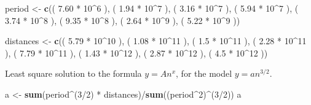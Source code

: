 \documentclass[]{article}
\newenvironment{Shaded}{\begin{snugshade}}{\end{snugshade}}
\newcommand{\KeywordTok}[1]{\textcolor[rgb]{0.13,0.29,0.53}{\textbf{{#1}}}}
\newcommand{\DecValTok}[1]{\textcolor[rgb]{0.00,0.00,0.81}{{#1}}}
\newcommand{\FloatTok}[1]{\textcolor[rgb]{0.00,0.00,0.81}{{#1}}}
\newcommand{\StringTok}[1]{\textcolor[rgb]{0.31,0.60,0.02}{{#1}}}
\newcommand{\NormalTok}[1]{{#1}}
\begin{document}
\begin{Shaded}
\begin{Highlighting}[]
\NormalTok{period <-}\StringTok{ }\KeywordTok{c}\NormalTok{(( }\FloatTok{7.60} \NormalTok{*}\StringTok{ }\DecValTok{10}\NormalTok{^}\DecValTok{6} \NormalTok{), ( }\FloatTok{1.94} \NormalTok{*}\StringTok{ }\DecValTok{10}\NormalTok{^}\DecValTok{7} \NormalTok{), ( }\FloatTok{3.16} \NormalTok{*}\StringTok{ }\DecValTok{10}\NormalTok{^}\DecValTok{7} \NormalTok{), }
            \NormalTok{( }\FloatTok{5.94} \NormalTok{*}\StringTok{ }\DecValTok{10}\NormalTok{^}\DecValTok{7} \NormalTok{), ( }\FloatTok{3.74} \NormalTok{*}\StringTok{ }\DecValTok{10}\NormalTok{^}\DecValTok{8} \NormalTok{), ( }\FloatTok{9.35} \NormalTok{*}\StringTok{ }\DecValTok{10}\NormalTok{^}\DecValTok{8} \NormalTok{), }
            \NormalTok{( }\FloatTok{2.64} \NormalTok{*}\StringTok{ }\DecValTok{10}\NormalTok{^}\DecValTok{9} \NormalTok{), ( }\FloatTok{5.22} \NormalTok{*}\StringTok{ }\DecValTok{10}\NormalTok{^}\DecValTok{9} \NormalTok{))}

\NormalTok{distances <-}\StringTok{ }\KeywordTok{c}\NormalTok{(( }\FloatTok{5.79} \NormalTok{*}\StringTok{ }\DecValTok{10}\NormalTok{^}\DecValTok{10} \NormalTok{), ( }\FloatTok{1.08} \NormalTok{*}\StringTok{ }\DecValTok{10}\NormalTok{^}\DecValTok{11} \NormalTok{), ( }\FloatTok{1.5} \NormalTok{*}\StringTok{ }\DecValTok{10}\NormalTok{^}\DecValTok{11}  \NormalTok{), }
               \NormalTok{( }\FloatTok{2.28} \NormalTok{*}\StringTok{ }\DecValTok{10}\NormalTok{^}\DecValTok{11} \NormalTok{), ( }\FloatTok{7.79} \NormalTok{*}\StringTok{ }\DecValTok{10}\NormalTok{^}\DecValTok{11} \NormalTok{), ( }\FloatTok{1.43} \NormalTok{*}\StringTok{ }\DecValTok{10}\NormalTok{^}\DecValTok{12} \NormalTok{), }
               \NormalTok{( }\FloatTok{2.87} \NormalTok{*}\StringTok{ }\DecValTok{10}\NormalTok{^}\DecValTok{12} \NormalTok{), ( }\FloatTok{4.5} \NormalTok{*}\StringTok{ }\DecValTok{10}\NormalTok{^}\DecValTok{12}  \NormalTok{))}
\end{Highlighting}
\end{Shaded}

Least square solution to the formula \(y = An^x\), for the model
\(y = an^{3/2}\).

\begin{Shaded}
\begin{Highlighting}[]
\NormalTok{a <-}\StringTok{ }\KeywordTok{sum}\NormalTok{(period^(}\DecValTok{3}\NormalTok{/}\DecValTok{2}\NormalTok{) *}\StringTok{ }\NormalTok{distances)/}\KeywordTok{sum}\NormalTok{((period^}\DecValTok{2}\NormalTok{)^(}\DecValTok{3}\NormalTok{/}\DecValTok{2}\NormalTok{))}
\NormalTok{a}
\end{Highlighting}
\end{Shaded}
\end{document}
